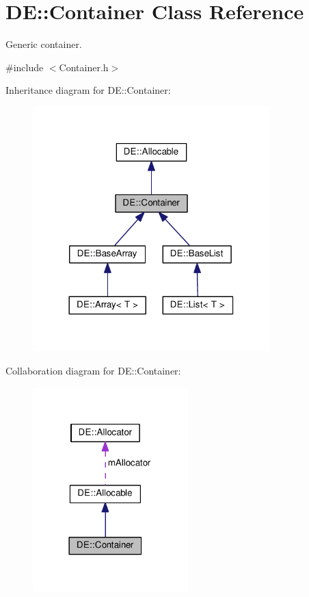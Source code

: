 \hypertarget{classDE_1_1Container}{}\section{DE\+:\+:Container Class Reference}
\label{classDE_1_1Container}


Generic container.  




{\ttfamily \#include $<$Container.\+h$>$}



Inheritance diagram for DE\+:\+:Container\+:
\nopagebreak
\begin{figure}[H]
\begin{center}
\leavevmode
\includegraphics[width=260pt]{classDE_1_1Container__inherit__graph}
\end{center}
\end{figure}


Collaboration diagram for DE\+:\+:Container\+:
\nopagebreak
\begin{figure}[H]
\begin{center}
\leavevmode
\includegraphics[width=170pt]{classDE_1_1Container__coll__graph}
\end{center}
\end{figure}
